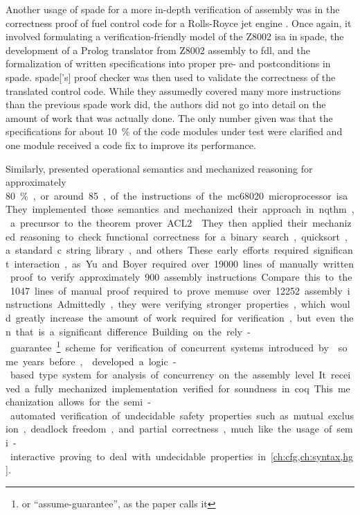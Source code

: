 Another usage of \gls{spade} for a more in-depth verification of assembly
was in the correctness proof of fuel control code for a Rolls-Royce
jet engine \autocite{oneill1988verification}. Once again,
it involved formulating a verification-friendly model of the Z8002 \gls{isa}
in \gls{spade}, the development of a Prolog translator from Z8002 assembly to \gls{fdl},
and the formalization of written specifications into proper pre- and postconditions
in \gls{spade}. \Gls{spade}['s] proof checker was then used to validate the correctness
of the translated control code. While they assumedly covered many more instructions
than the previous \gls{spade} work did, the authors did not go into detail
on the amount of work that was actually done.
The only number given was that the specifications for about \SI{10}{\percent}
of the code modules under test were clarified
and one module received a code fix to improve its performance.

Similarly, \textcite{yu1993automated,boyer1996automated}
presented operational semantics and mechanized reasoning
for approximately \SI{80}\percent, or around \num{85}, of the instructions of the \gls{mc68020} microprocessor \gls{isa}.
They implemented those semantics and mechanized their approach
in \gls{nqthm}, a precursor to the theorem prover ACL2 \autocite{ACL2}.
They then applied their mechanized reasoning to check functional correctness
for a binary search, quicksort, a standard \gls{c} string library, and others.
These early efforts required significant interaction,
as Yu and Boyer required over \num{19000}
lines of manually written proof to verify approximately \num{900} assembly instructions.
Compare this to the \num{1047} lines of manual proof
required to prove \gls{memuse} over \num{12252} assembly instructions.
Admittedly, they were verifying stronger properties,
which would greatly increase the amount of work required for verification,
but even then that is a significant difference.

Building on the rely-guarantee\footnote{or ``assume-guarantee'', as the paper calls it} scheme for verification of concurrent systems introduced by \textcite{xu1997rely-guarantee} some years before,
\textcite{yu2004concurrent} developed a logic-based type system for analysis of concurrency on the assembly level.
It received a fully mechanized implementation verified for soundness in \gls{coq}.
This mechanization allows for the semi-automated verification of undecidable safety properties such as mutual exclusion, deadlock freedom, and partial correctness, much like the usage of semi-interactive proving to deal with undecidable properties in \cref{ch:cfg,ch:syntax,hg}.

